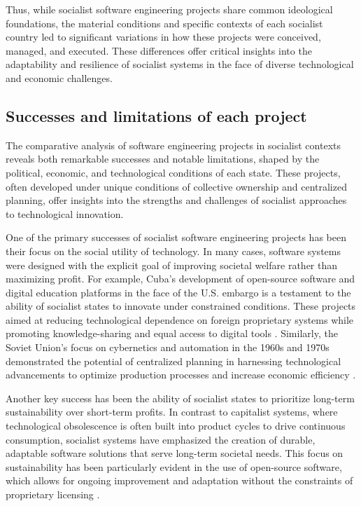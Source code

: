 \begin{refsection}
Thus, while socialist software engineering projects share common ideological foundations, the material conditions and specific contexts of each socialist country led to significant variations in how these projects were conceived, managed, and executed. These differences offer critical insights into the adaptability and resilience of socialist systems in the face of diverse technological and economic challenges.

\subsection{Successes and limitations of each project}

The comparative analysis of software engineering projects in socialist contexts reveals both remarkable successes and notable limitations, shaped by the political, economic, and technological conditions of each state. These projects, often developed under unique conditions of collective ownership and centralized planning, offer insights into the strengths and challenges of socialist approaches to technological innovation.

One of the primary successes of socialist software engineering projects has been their focus on the social utility of technology. In many cases, software systems were designed with the explicit goal of improving societal welfare rather than maximizing profit. For example, Cuba's development of open-source software and digital education platforms in the face of the U.S. embargo is a testament to the ability of socialist states to innovate under constrained conditions. These projects aimed at reducing technological dependence on foreign proprietary systems while promoting knowledge-sharing and equal access to digital tools \cite[pp.~87-90]{kapcia2008}. Similarly, the Soviet Union’s focus on cybernetics and automation in the 1960s and 1970s demonstrated the potential of centralized planning in harnessing technological advancements to optimize production processes and increase economic efficiency \cite[pp.~133-136]{gerovitch2002}.

Another key success has been the ability of socialist states to prioritize long-term sustainability over short-term profits. In contrast to capitalist systems, where technological obsolescence is often built into product cycles to drive continuous consumption, socialist systems have emphasized the creation of durable, adaptable software solutions that serve long-term societal needs. This focus on sustainability has been particularly evident in the use of open-source software, which allows for ongoing improvement and adaptation without the constraints of proprietary licensing \cite[pp.~215-218]{kapcia2008}.


\end{refsection}
